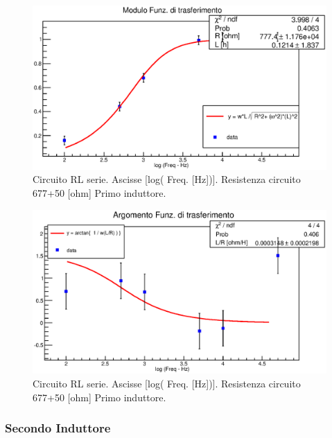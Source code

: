 \begin{figure}[H]
\centering
\includegraphics[scale=0.7]{Grafici/C3_P1_ModFdT_ind1.eps}
\caption{
Circuito RL serie.
Ascisse [log( Freq. [Hz])].
Resistenza circuito 677+50 [ohm]
Primo induttore.
}
\label{fig:C3_P1_ModFdT_ind1}
\end{figure}

\begin{figure}[H]
\centering
\includegraphics[scale=0.7]{Grafici/C3_P1_ArgFdT_ind1.eps}
\caption{
Circuito RL serie.
Ascisse [log( Freq. [Hz])].
Resistenza circuito 677+50 [ohm]
Primo induttore.
}
\label{fig:C3_P1_ArgFdT_ind1}
\end{figure}





\break
\subsubsection*{Secondo Induttore}

